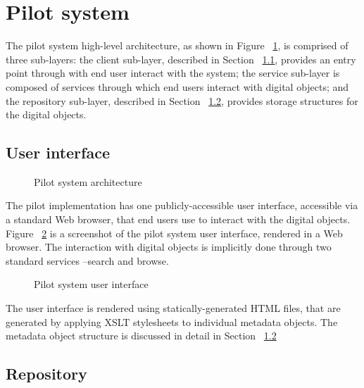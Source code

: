 \section{Pilot system}
\label{sec:pilot-study:pilot-system}

The pilot system high-level architecture, as shown in Figure
~\ref{fig:pilot-study:pilot-system:architecture}, is comprised of
three sub-layers: the client sub-layer, described in Section
~\ref{sec:pilot-study:pilot-system:user-interface}, provides an entry point
through with end user interact with the system; the service sub-layer is
composed of services through which end users interact with digital objects; and
the repository sub-layer, described in Section
~\ref{sec:pilot-study:pilot-system:repository},  provides storage
structures for the digital objects.

\subsection{User interface}
\label{sec:pilot-study:pilot-system:user-interface}

\begin{figure}
 \centering
 \framebox[\textwidth]{
 
 }
 \caption{Pilot system architecture}
 \label{fig:pilot-study:pilot-system:architecture}
\end{figure}

The pilot implementation has one publicly-accessible user interface, accessible
via a standard Web browser, that end users use to interact with the
digital objects. Figure ~\ref{fig:pilot-study:pilot-system:user-interface} is
a screenshot of the pilot system user interface, rendered in a Web browser. The
interaction with digital objects is implicitly done through two standard
services --search and browse.

\begin{figure}
 \centering
 \caption{Pilot system user interface}
 \label{fig:pilot-study:pilot-system:user-interface}
\end{figure}

The user interface is rendered using statically-generated HTML files, that are
generated by applying XSLT stylesheets to individual metadata objects. The
metadata object structure is discussed in detail in Section
~\ref{sec:pilot-study:pilot-system:repository}

\subsection{Repository}
\label{sec:pilot-study:pilot-system:repository}

